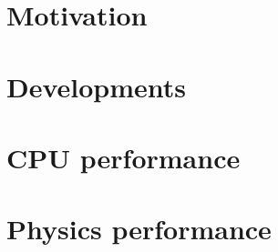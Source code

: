 
\section{Motivation}

\section{Developments}


\section{CPU performance}

\section{Physics performance}
